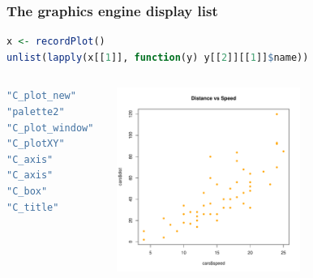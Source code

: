 \documentclass{beamer}
\begin{document}
\begin{frame}[fragile]
\frametitle{The graphics engine display list}


\begin{lstlisting}[language = R]
x <- recordPlot()
unlist(lapply(x[[1]], function(y) y[[2]][[1]]$name))
\end{lstlisting}

\begin{columns}[c]
\begin{lstlisting}[language = R]
"C_plot_new"    
"palette2"      
"C_plot_window" 
"C_plotXY"      
"C_axis"        
"C_axis"       
"C_box"         
"C_title"    
\end{lstlisting}


\includegraphics[height = 6cm, width = 6cm]{plot/intro_1.pdf}

\end{columns}

\end{frame}



\end{document}
